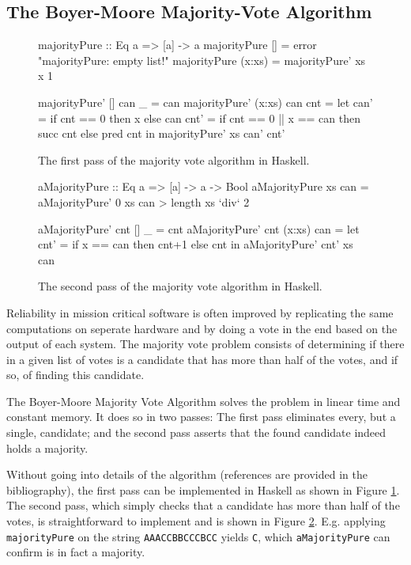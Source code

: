 \documentclass[a4paper, 10pt]{article}
\theoremstyle{example}
\begin{document}
\newpage
\subsection{The Boyer-Moore Majority-Vote Algorithm}
\label{subsec:boyer_moore}

\begin{figure}[ht!]
\begin{code}
majorityPure :: Eq a => [a] -> a
majorityPure []     = error "majorityPure: empty list!"
majorityPure (x:xs) = majorityPure' xs x 1

majorityPure' []     can _   = can
majorityPure' (x:xs) can cnt =
  let
    can' = if cnt == 0 then x else can
    cnt' = if cnt == 0 || x == can then succ cnt else pred cnt
  in
    majorityPure' xs can' cnt'
\end{code}
\caption{The first pass of the majority vote algorithm in Haskell.}
\label{fig:majority_pure}
\end{figure}



\begin{figure}[ht!]
\begin{code}
aMajorityPure :: Eq a => [a] -> a -> Bool
aMajorityPure xs can = aMajorityPure' 0 xs can > length xs `div` 2

aMajorityPure' cnt []     _   = cnt
aMajorityPure' cnt (x:xs) can =
  let
    cnt' = if x == can then cnt+1 else cnt
  in
    aMajorityPure' cnt' xs can
\end{code}
\caption{The second pass of the majority vote algorithm in Haskell.}
\label{fig:amajority_pure}
\end{figure}

Reliability in mission critical software is often improved by replicating
the same computations on seperate hardware and by doing a vote in the end
based on the output of each system. The majority vote problem consists of
determining if there in a given list of votes is a candidate that has more
than half of the votes, and if so, of finding this candidate.

The Boyer-Moore Majority Vote Algorithm \citep{MooreBoyer82, Hesselink2005}
solves the problem in linear time and constant memory. It does so in two passes:
The first pass eliminates every, but a single, candidate; and the second pass
asserts that the found candidate indeed holds a majority.

Without going into details of the algorithm (references are provided in the
bibliography), the first pass can be implemented in Haskell as shown in Figure
\ref{fig:majority_pure}. The second pass, which simply checks that a candidate
has more than half of the votes, is straightforward to implement and is shown
in Figure \ref{fig:amajority_pure}.
E.g. applying {\tt majorityPure} on the string {\tt AAACCBBCCCBCC} yields
{\tt C}, which {\tt aMajorityPure} can confirm is in fact a majority.
\end{document}
